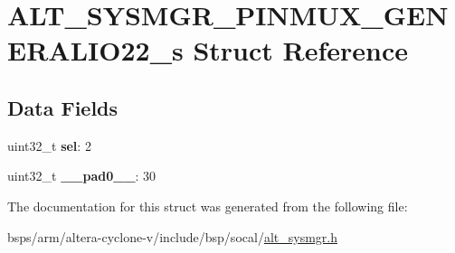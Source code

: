 \hypertarget{structALT__SYSMGR__PINMUX__GENERALIO22__s}{}\section{A\+L\+T\+\_\+\+S\+Y\+S\+M\+G\+R\+\_\+\+P\+I\+N\+M\+U\+X\+\_\+\+G\+E\+N\+E\+R\+A\+L\+I\+O22\+\_\+s Struct Reference}
\label{structALT__SYSMGR__PINMUX__GENERALIO22__s}
\subsection*{Data Fields}
\begin{DoxyCompactItemize}
\item 
\mbox{\label{structALT__SYSMGR__PINMUX__GENERALIO22__s_aa9e4e992a9846eb48479c76a8e22ea20}} 
uint32\+\_\+t {\bfseries sel}\+: 2
\item 
\mbox{\label{structALT__SYSMGR__PINMUX__GENERALIO22__s_a7774c169cf1b8cdaa5d8e89d4affe598}} 
uint32\+\_\+t {\bfseries \+\_\+\+\_\+pad0\+\_\+\+\_\+}\+: 30
\end{DoxyCompactItemize}


The documentation for this struct was generated from the following file\+:\begin{DoxyCompactItemize}
\item 
bsps/arm/altera-\/cyclone-\/v/include/bsp/socal/\mbox{\hyperlink{alt__sysmgr_8h}{alt\+\_\+sysmgr.\+h}}\end{DoxyCompactItemize}
